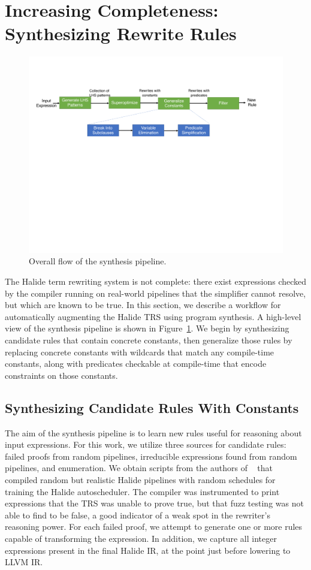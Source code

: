 \documentclass[sigplan,10pt,review,anonymous]{acmart}\settopmatter{printfolios=true,printccs=false,printacmref=false}
\begin{document}
\section{Increasing Completeness: Synthesizing Rewrite Rules}
\begin{figure}
\includegraphics[width=1.9\columnwidth]{figures/synthesis-flow.pdf}
\caption{Overall flow of the synthesis pipeline.}
\label{fig:synthesis-flow}
\end{figure}


The Halide term rewriting system is not complete: there
exist expressions checked by the compiler running on real-world pipelines that
the simplifier cannot resolve, but which are known to be true. 
In this section, we describe a workflow for automatically augmenting the Halide
TRS using program synthesis.
A high-level view of the synthesis pipeline is shown in Figure~\ref{fig:synthesis-flow}.
We begin by synthesizing candidate rules that contain concrete constants,
then generalize those rules by replacing concrete constants with wildcards that
match any compile-time constants, along with predicates checkable at compile-time
that encode constraints on those constants.

\subsection{Synthesizing Candidate Rules With Constants}
The aim of the synthesis pipeline is to learn new rules useful for reasoning about input expressions.
For this work, we utilize three sources for candidate rules: failed proofs from
random pipelines, irreducible expressions found from random pipelines, and enumeration.
We obtain scripts from the authors of \citeauthor{Adams2019}~\cite{Adams2019} that compiled
 random but realistic Halide pipelines with random schedules for
training the Halide autoscheduler. The compiler was instrumented to print
expressions that the TRS was unable to prove true, but that fuzz
testing was not able to find to be false, a good indicator of a weak spot in the
rewriter's reasoning power. For each failed proof, we attempt to generate one
or more rules capable of transforming the expression. In addition, we capture all
integer expressions present in the final Halide IR, at the point just before 
lowering to LLVM IR.
\end{document}
